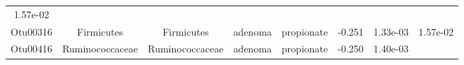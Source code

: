\documentclass[11pt,]{article}
\begin{document}
\begin{longtable}[]{@{}cccccccc@{}}
\begin{minipage}[t]{0.08\columnwidth}
1.57e-02\strut
\end{minipage}\tabularnewline
\begin{minipage}[t]{0.08\columnwidth}\centering\strut
Otu00316\strut
\end{minipage} & \begin{minipage}[t]{0.15\columnwidth}\centering\strut
Firmicutes\strut
\end{minipage} & \begin{minipage}[t]{0.15\columnwidth}\centering\strut
Firmicutes\strut
\end{minipage} & \begin{minipage}[t]{0.08\columnwidth}\centering\strut
adenoma\strut
\end{minipage} & \begin{minipage}[t]{0.09\columnwidth}\centering\strut
propionate\strut
\end{minipage} & \begin{minipage}[t]{0.07\columnwidth}\centering\strut
-0.251\strut
\end{minipage} & \begin{minipage}[t]{0.08\columnwidth}\centering\strut
1.33e-03\strut
\end{minipage} & \begin{minipage}[t]{0.08\columnwidth}\centering\strut
1.57e-02\strut
\end{minipage}\tabularnewline
\begin{minipage}[t]{0.08\columnwidth}\centering\strut
Otu00416\strut
\end{minipage} & \begin{minipage}[t]{0.15\columnwidth}\centering\strut
Ruminococcaceae\strut
\end{minipage} & \begin{minipage}[t]{0.15\columnwidth}\centering\strut
Ruminococcaceae\strut
\end{minipage} & \begin{minipage}[t]{0.08\columnwidth}\centering\strut
adenoma\strut
\end{minipage} & \begin{minipage}[t]{0.09\columnwidth}\centering\strut
propionate\strut
\end{minipage} & \begin{minipage}[t]{0.07\columnwidth}\centering\strut
-0.250\strut
\end{minipage} & \begin{minipage}[t]{0.08\columnwidth}\centering\strut
1.40e-03\strut
\end{minipage} & \begin{minipage}[t]{0.08\columnwidth}\centering\strut

\end{minipage}
\end{longtable}
\end{document}
